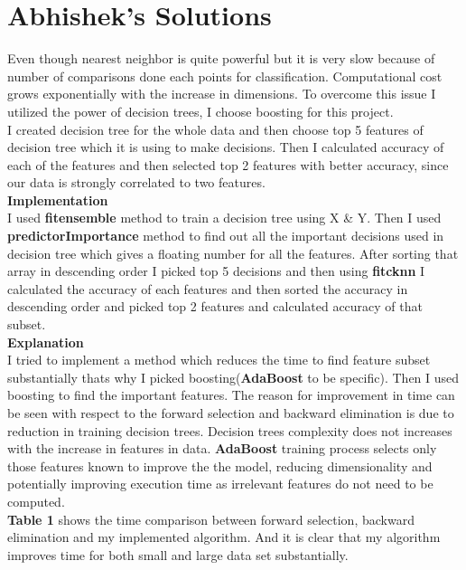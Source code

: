 \documentclass[a4paper, 11pt]{article}
\begin{document}
\section*{Abhishek's Solutions}
Even though nearest  neighbor is quite powerful but it is very slow because of number of comparisons done each points for classification. Computational cost grows exponentially with the increase in dimensions.
To overcome this issue I utilized the power of decision trees, I choose boosting for this project.\\
I created decision tree for the whole data and then choose top 5 features of decision tree which it is using to make decisions. Then I calculated accuracy of each of the features and then selected top 2 features with better accuracy, since our data is strongly correlated to two features.\\
\noindent\textbf{Implementation}\\
I used \textbf{fitensemble} method to train a decision tree using X \& Y. Then I used \textbf{predictorImportance} method to find out all the important decisions used in decision tree which gives a floating number for all the features. After sorting that array in descending order I picked top 5 decisions and then using \textbf{fitcknn} I calculated the accuracy of each features and then sorted the accuracy in descending order and picked top 2 features and calculated accuracy of that subset.\cite{matlab,matlab2}\\
\noindent\textbf{Explanation}\\
I tried to implement a method which reduces the time to find feature subset substantially thats why I picked boosting(\textbf{AdaBoost} to be specific). Then I used boosting to find the important features. The reason for improvement in time can be seen with respect to the forward selection and backward elimination is due to reduction in training decision trees. Decision trees complexity does not increases with the increase in features in data. \textbf{AdaBoost} training process selects only those features known to improve the the model, reducing dimensionality and potentially improving execution time as irrelevant features do not need to be computed. \cite{Wiki2} \\
\textbf{Table 1} shows the time comparison between forward selection, backward elimination and my implemented algorithm. And it is clear that my algorithm improves time for both small and large data set substantially.\\ 
\end{document}
